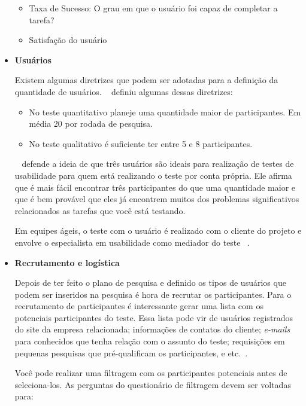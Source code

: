 \begin{itemize}
	\begin{itemize}
		\item Taxa de Sucesso: O grau em que o usuário foi capaz de completar a tarefa?
		\item Satisfação do usuário
	\end{itemize}

\item \textbf{Usuários}

Existem algumas diretrizes que podem ser adotadas para a definição da quantidade de usuários. ~ definiu algumas dessas diretrizes:

\begin{itemize}
\item No teste quantitativo planeje uma quantidade maior de participantes. Em média 20 por rodada de pesquisa.
\item No teste qualitativo é suficiente ter entre 5 e 8 participantes.
\end{itemize}

	 ~ defende a ideia de que três usuários são ideais para realização de testes de usabilidade para quem está realizando o teste por conta própria. Ele afirma que é mais fácil encontrar três participantes do que uma quantidade maior e que é bem provável que eles já encontrem muitos dos problemas significativos relacionados as tarefas que você está testando.

	Em equipes ágeis, o teste com o usuário é realizado com o cliente do projeto e envolve o especialista em usabilidade como mediador do teste ~\cite{santos2012}.

\item \textbf{Recrutamento e logística}

Depois de ter feito o plano de pesquisa e definido os tipos de usuários que podem ser inseridos na pesquisa é hora de recrutar os participantes.
Para o recrutamento de participantes é interessante gerar uma lista com os potenciais participantes do teste. Essa lista pode vir de usuários registrados do site da empresa relacionada; informações de contatos do cliente; \textit{e-mails} para conhecidos que tenha relação com o assunto do teste; requisições em pequenas pesquisas que pré-qualificam os participantes, e etc.~\cite{unger2009}.

Você pode realizar uma filtragem com os participantes potenciais antes de seleciona-los. As perguntas do questionário de filtragem devem ser voltadas para:


\end{itemize}
